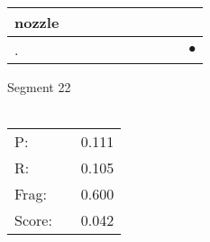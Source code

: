 \documentclass[landscape]{article}
\newcommand{\ssp}{\hspace{2pt}}
\newcommand{\mex}{\cellcolor{g}$\bullet$}
\begin{document}
\begin{tabular}{|l|p{10pt}|p{10pt}|p{10pt}|p{10pt}|p{10pt}|p{10pt}|p{10pt}|p{10pt}|p{10pt}|}
\hline
\ssp nozzle \ssp&\hspace{2pt}&\hspace{2pt}&\hspace{2pt}&\hspace{2pt}&\hspace{2pt}&\hspace{2pt}&\hspace{2pt}&\hspace{2pt}&\hspace{2pt}\\
\hline
\ssp \cellcolor{ref8}. \ssp&\hspace{2pt}&\hspace{2pt}&\hspace{2pt}&\hspace{2pt}&\hspace{2pt}&\hspace{2pt}&\hspace{2pt}&\hspace{2pt}&\hspace{2pt}\mex\\
\hline
\end{tabular}

\vspace{6pt}
\noindent Segment 22\\\\
\noindent\begin{tabular}{lm{12pt}r}
\hline
P:&&0.111\\
R:&&0.105\\
Frag:&&0.600\\
Score:&&0.042\\
\end{tabular}

\newpage
\end{document}
